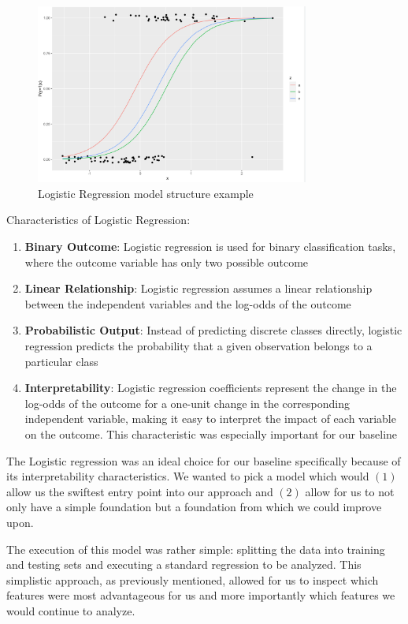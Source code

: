 \documentclass[10pt,sigconf,letterpaper,nonacm]{acmart}
\begin{document}
\begin{figure}[!h]
  \centering
  \includegraphics[width=9cm]{Figures_and_Graphs/LogReg.png}
  \caption{Logistic Regression model structure example}
  \label{fig:RFExample}
\end{figure}

Characteristics of Logistic Regression:
\begin{enumerate}
  \item \textbf{Binary Outcome}: Logistic regression is used for binary classification tasks, where the outcome variable has only two possible outcome
  \item \textbf{Linear Relationship}: Logistic regression assumes a linear relationship between the independent variables and the log-odds of the outcome
  \item \textbf{Probabilistic Output}: Instead of predicting discrete classes directly, logistic regression predicts the probability that a given observation belongs to a particular class
  \item \textbf{Interpretability}: Logistic regression coefficients represent the change in the log-odds of the outcome for a one-unit change in the corresponding independent variable, making it easy to interpret the impact of each variable on the outcome. This characteristic was especially important for our baseline
\end{enumerate}

The Logistic regression was an ideal choice for our baseline specifically because of its interpretability characteristics. We wanted to pick a model which would $(1)$ allow us the swiftest entry point into our approach and $(2)$ allow for us to not only have a simple foundation but a foundation from which we could improve upon.

The execution of this model was rather simple: splitting the data into training and testing sets and executing a standard regression to be analyzed. This simplistic approach, as previously mentioned, allowed for us to inspect which features were most advantageous for us and more importantly which features we would continue to analyze.
\end{document}
